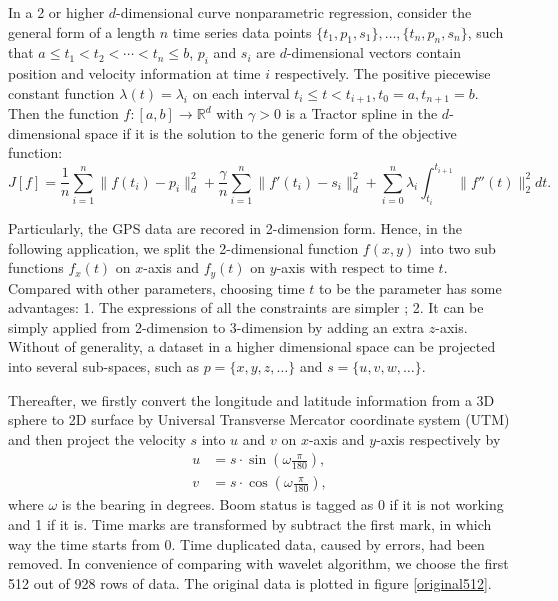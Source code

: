 In a 2 or higher $d$-dimensional curve nonparametric regression, consider the general form of a length $n$ time series data points $\{t_1,p_1,s_1\}, \ldots, \{t_n,p_n,s_n\}$, such that $a \leq t_1<t_2< \cdots < t_n \leq b$, $p_i$ and $s_i$ are $d$-dimensional vectors contain position and velocity information at time $i$ respectively. The positive piecewise constant function $\lambda(t) = \lambda_i$ on each interval $t_i \leq t<t_{i+1}, t_0=a, t_{n+1}=b$.  Then the function $f:[a,b]\rightarrow \mathbb{R}^d$ with $\gamma>0$ is a Tractor spline in the $d$-dimensional space if it is the solution to the generic form of the objective function: 
\begin{equation}\label{tractorsplineObjective2D}
J[f]= \frac{1}{n} \sum_{i=1}^{n} \lVert f(t_i)-p_i\rVert_d^2 + \frac{\gamma}{n} \sum_{i=1}^{n} \lVert f'(t_i)-s_i \rVert_d^2 +\sum_{i=0}^{n} \lambda_i\int_{t_i}^{t_{i+1}} \lVert f''(t)\rVert_2^2 dt. 
\end{equation}


Particularly, the GPS data are recored in 2-dimension form. Hence, in the following application, we split the 2-dimensional function $f(x,y)$ into two sub functions $f_x(t)$ on $x$-axis and $f_y(t)$ on $y$-axis with respect to time $t$. Compared with other parameters, choosing time $t$ to be the parameter has some advantages: 1. The expressions of all the constraints are simpler \cite{zhang2013cubic}; 2. It can be simply applied from 2-dimension to 3-dimension by adding an extra $z$-axis. Without of generality, a dataset in a higher dimensional space can be projected into several sub-spaces, such as $p=\{x,y,z,\ldots \}$ and $s=\{u,v,w,\ldots \}$. 


Thereafter, we firstly convert the longitude and latitude information from a 3D sphere to 2D surface by Universal Transverse Mercator coordinate system (UTM) and then project the velocity $s$ into $u$ and $v$ on $x$-axis and $y$-axis respectively by 
\begin{align}
u &=s\cdot \sin (\omega\frac{\pi}{180}),\\
v &= s\cdot \cos (\omega\frac{\pi}{180}),
\end{align}
where $\omega$ is the bearing in degrees. Boom status is tagged as 0 if it is not working and 1 if it is. Time marks are transformed by subtract the first mark, in which way the time starts from 0. Time duplicated data, caused by errors, had been removed. In convenience of comparing with wavelet algorithm, we choose the first 512 out of 928 rows of data. The original data is plotted in figure \ref{original512}.

